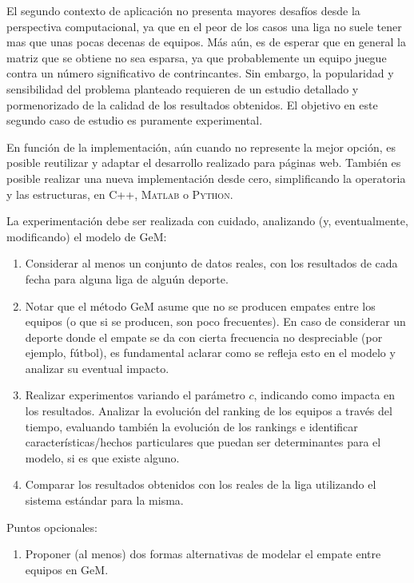 El segundo contexto de aplicaci\'on no presenta mayores desaf\'ios desde la perspectiva computacional, ya que en el peor de los casos una liga no suele tener
mas que unas pocas decenas de equipos. M\'as a\'un, es de esperar que en general la matriz que se obtiene no sea esparsa, ya que probablemente un equipo juegue
contra un n\'umero significativo de contrincantes. Sin embargo, la popularidad y sensibilidad del problema planteado requieren de un estudio detallado y 
pormenorizado de la calidad de los resultados obtenidos. El objetivo en este segundo caso de estudio es puramente experimental. 

En funci\'on de la implementaci\'on, a\'un cuando no represente la mejor opci\'on, es posible reutilizar y adaptar el desarrollo realizado para p\'aginas web. 
Tambi\'en es posible realizar una nueva implementaci\'on desde cero, simplificando la operatoria y las estructuras, en \textsc{C++}, \textsc{Matlab} o 
\textsc{Python}.

La experimentaci\'on debe ser realizada con cuidado, analizando (y, eventualmente, modificando) el modelo de GeM:
\begin{enumerate}
\item Considerar al menos un conjunto de datos reales, con los resultados de cada fecha para alguna liga de algu\'un deporte.
\item Notar que el m\'etodo GeM asume que no se producen empates entre los equipos (o que si se producen, son poco frecuentes). En caso de considerar un 
deporte donde el empate se da con cierta frecuencia no despreciable (por ejemplo, f\'utbol), es fundamental aclarar como se refleja esto en el modelo y 
analizar su eventual impacto.
\item Realizar experimentos variando el par\'ametro $c$, indicando como impacta en los resultados. Analizar la evoluci\'on del ranking de los equipos a 
trav\'es del tiempo, evaluando tambi\'en la evoluci\'on de los rankings e identificar caracter\'isticas/hechos particulares que puedan ser determinantes 
para el modelo, si es que existe alguno.
\item Comparar los resultados obtenidos con los reales de la liga utilizando el sistema est\'andar para la misma.
\end{enumerate}

Puntos opcionales:
\begin{enumerate}
\item Proponer (al menos) dos formas alternativas de modelar el empate entre equipos en GeM.
\end{enumerate}


